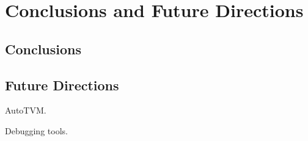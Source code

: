 \section{Conclusions and Future Directions}
\label{sec:conclude}

\subsection{Conclusions}

\subsection{Future Directions}

AutoTVM.

Debugging tools.
